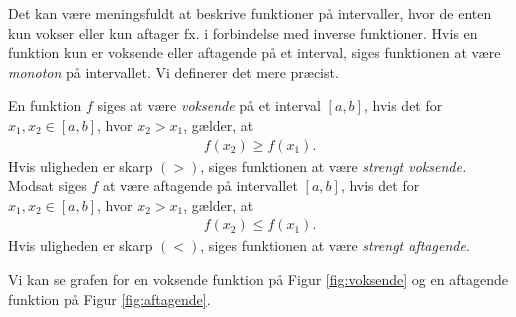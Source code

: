 Det kan være meningsfuldt at beskrive funktioner på intervaller, hvor de enten kun vokser eller kun aftager fx. i forbindelse med inverse funktioner. Hvis en funktion kun er voksende eller aftagende på et interval, siges funktionen at være \textit{monoton} på intervallet. Vi definerer det mere præcist.
\begin{defn}[Monotoni]
	En funktion $f$ siges at være \textit{voksende} på et interval $[a,b]$, hvis det for
	 $x_1,x_2\in [a,b]$, hvor $x_2 > x_1$, gælder, at 
	\begin{align*}
		f(x_2) \geq f(x_1).
	\end{align*}
	Hvis uligheden er skarp $(>)$, siges funktionen at være \textit{strengt voksende.} Modsat siges $f$ at være 
	aftagende på intervallet $[a,b]$, hvis det for $x_1,x_2 \in [a,b]$, hvor $x_2 > x_1$, gælder, at
	\begin{align*}
		f(x_2) \leq f(x_1).
	\end{align*}
	Hvis uligheden er skarp $(<)$, siges funktionen at være \textit{strengt aftagende.}
\end{defn}
Vi kan se grafen for en voksende funktion på Figur \ref{fig:voksende} og en aftagende funktion på Figur \ref{fig:aftagende}.

